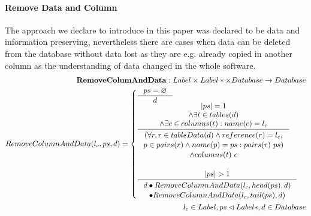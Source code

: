 \documentclass[11pt]{article}
\begin{document}
\paragraph{Remove Data and Column} The approach we declare to introduce in this paper was declared to be data and information preserving, nevertheless there are cases when data can be deleted from the database without data lost as they are e.g. already copied in another column as the understanding of data changed in the whole software. 
\begin{align*}
	\mathbf{RemoveColumAndData} : Label \times Label* \times Database \rightarrow Database \\
	RemoveColumnAndData(l_c, ps, d) = \begin{cases}
 	\inference{ps = \varnothing}{d}\\
 	\inference{|ps| = 1 \\ \wedge \exists t \in tables(d) \\ \wedge \exists c \in columns(t) : name(c) = l_c}{\begin{gathered}
	 	(\forall r, r \in tableData(d) \wedge reference(r) = l_c, \\ p \in pairs(r) \wedge name(p) = ps : pairs(r) \ ps) \\ \wedge columns(t) \ c  
\end{gathered}}\\ \\
	\inference{|ps| >1}{\begin{gathered}
		d \bullet RemoveColumnAndData(l_c, head(ps), d) \\ \bullet RemoveColumnAndData(l_c, tail(ps), d) 
\end{gathered}}
 \end{cases}
	\\
	l_c \in Label, ps \lhd Label*, d \in Database
\end{align*}
\end{document}
